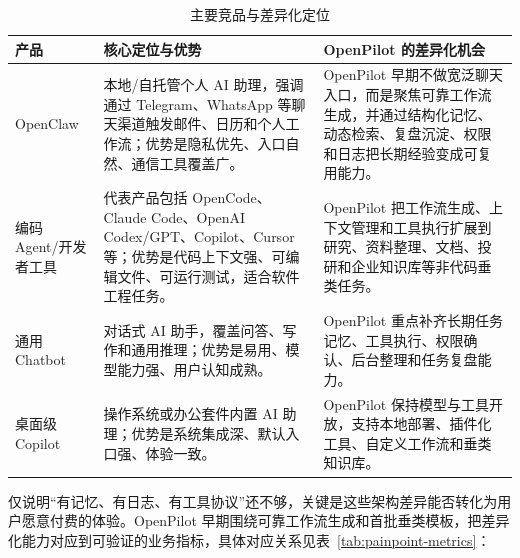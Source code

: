 \documentclass[12pt,a4paper]{ctexart}
\begin{document}
\begin{table}[htbp]
  \centering
  \small
  \begin{tabularx}{\textwidth}{p{2.5cm} X X}
    \toprule
    \textbf{产品} & \textbf{核心定位与优势} & \textbf{OpenPilot 的差异化机会} \\
    \midrule
    OpenClaw & 本地/自托管个人 AI 助理，强调通过 Telegram、WhatsApp 等聊天渠道触发邮件、日历和个人工作流；优势是隐私优先、入口自然、通信工具覆盖广。 & OpenPilot 早期不做宽泛聊天入口，而是聚焦可靠工作流生成，并通过结构化记忆、动态检索、复盘沉淀、权限和日志把长期经验变成可复用能力。 \\
    编码 Agent/开发者工具 & 代表产品包括 OpenCode、Claude Code、OpenAI Codex/GPT、Copilot、Cursor 等；优势是代码上下文强、可编辑文件、可运行测试，适合软件工程任务。 & OpenPilot 把工作流生成、上下文管理和工具执行扩展到研究、资料整理、文档、投研和企业知识库等非代码垂类任务。 \\
    通用 Chatbot & 对话式 AI 助手，覆盖问答、写作和通用推理；优势是易用、模型能力强、用户认知成熟。 & OpenPilot 重点补齐长期任务记忆、工具执行、权限确认、后台整理和任务复盘能力。 \\
    桌面级 Copilot & 操作系统或办公套件内置 AI 助理；优势是系统集成深、默认入口强、体验一致。 & OpenPilot 保持模型与工具开放，支持本地部署、插件化工具、自定义工作流和垂类知识库。 \\
    \bottomrule
  \end{tabularx}
  \caption{主要竞品与差异化定位}
  \label{tab:competitors}
\end{table}

仅说明“有记忆、有日志、有工具协议”还不够，关键是这些架构差异能否转化为用户愿意付费的体验。OpenPilot 早期围绕可靠工作流生成和首批垂类模板，把差异化能力对应到可验证的业务指标，具体对应关系见表~\ref{tab:painpoint-metrics}：
\end{document}
